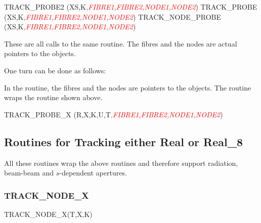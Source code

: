 %
\begin{ptccode}
TRACK_PROBE2 (XS,K\textit{\textcolor{red}{,FIBRE1,FIBRE2,NODE1,NODE2}})
TRACK_PROBE (XS,K\textit{\textcolor{red}{,FIBRE1,FIBRE2,NODE1,NODE2}})
TRACK_NODE_PROBE (XS,K\textit{\textcolor{red}{,FIBRE1,FIBRE2,NODE1,NODE2}})
\end{ptccode}

These are all calls to the same routine. The fibres and the nodes
are actual pointers to the objects.

%
One turn can be done as follows:


%
In the  routine, the fibres and the nodes are pointers to the objects.
The routine wraps the  routine shown above.

\begin{ptccode}
TRACK_PROBE_X (R,X,K,U,T\textit{\textcolor{red}{,FIBRE1,FIBRE2,NODE1,NODE2}})
\end{ptccode}



\subsection{Routines for Tracking either Real or Real_8}

All these routines wrap the above routines and therefore support radiation,
beam-beam and $s$-dependent apertures.


\subsubsection{TRACK_NODE_X}

%
\begin{ptccode}
TRACK_NODE_X(T,X,K)
\end{ptccode}


